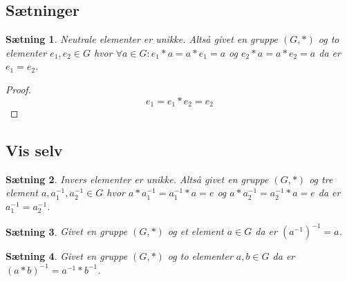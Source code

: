 \documentclass{article}
\newcommand{\inv}{^{-1}}
\newtheorem{setn}{Sætning}
\begin{document}
		\subsection*{Sætninger}
		\begin{setn}
			Neutrale elementer er unikke. Altså givet en gruppe $(G,*)$ og to elementer
			$e_1, e_2 \in G$ hvor $\forall a \in G: e_1*a=a*e_1=a$ og $e_2*a=a*e_2=a$
			da er $e_1 = e_2$.
		\end{setn}
		\begin{proof}
			$$e_1 = e_1*e_2 = e_2$$
		\end{proof}
		\subsection*{Vis selv}
		\begin{setn}
			Invers elementer er unikke. Altså givet en gruppe $(G,*)$ og tre element
			$a,a_1\inv,a_2\inv\in G$ hvor $a*a_1\inv=a_1\inv*a=e$ og $a*a_2\inv=a_2\inv*a=e$
			da er $a_1\inv = a_2\inv$.
		\end{setn}
		\begin{setn}
			Givet en gruppe $(G,*)$ og et element $a \in G$ da er $(a\inv)\inv = a$.
		\end{setn}
		\begin{setn}
			Givet en gruppe $(G,*)$ og to elementer $a,b \in G$ da er $(a*b)\inv=a\inv*b\inv$.
		\end{setn}
\end{document}
